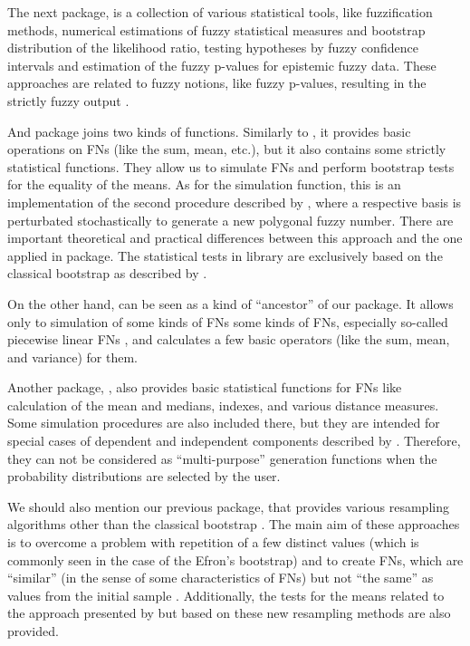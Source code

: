 The next package,  \citep{FuzzySTsMan} is a collection of various statistical tools, like fuzzification methods, numerical estimations of fuzzy statistical measures and bootstrap distribution of the likelihood ratio, testing hypotheses by fuzzy confidence intervals and estimation of the fuzzy p-values for epistemic fuzzy data.
These approaches are related to fuzzy notions, like fuzzy p-values, resulting in the strictly fuzzy output \citep{Berkachy2019}.

And  \citep{Trutschnig2013} package joins two kinds of functions.
Similarly to , it provides basic operations on FNs (like the sum, mean, etc.), but it also contains some strictly statistical functions.
They allow us to simulate FNs and perform bootstrap tests for the equality of the means.
As for the simulation function, this is an implementation of the second procedure described by \cite{GONZALEZRODRIGUEZ2009642}, where a respective basis is perturbated stochastically to generate
a new polygonal fuzzy number.
There are important theoretical and practical differences \citep{FRV} between this approach and the one applied in  package.
The statistical tests in  library are exclusively based on the classical bootstrap as described by \cite{COLUBI2009344,Montenegro2004}.

On the other hand,  \citep{SimPLFNMan} can be seen as a kind of ``ancestor'' of our package.
It allows only to simulation of some kinds of FNs some kinds of FNs, especially so-called piecewise linear FNs \citep{COROIANU201326}, and calculates a few basic operators (like the sum, mean, and variance) for them.

Another package,  \citep{FuzzyStatTraMan}, also provides basic statistical functions for FNs like calculation of the mean and medians, indexes, and various distance measures.
Some simulation procedures are also included there, but they are intended for special cases of dependent and independent components described by \cite{7295579}.
Therefore, they can not be considered as ``multi-purpose'' generation functions when the probability distributions are selected by the user.

We should also mention our previous package,  \citep{FuzzyResampling} that provides various resampling algorithms other than the classical bootstrap \citep{fuzzyResamplingArt}.
The main aim of these approaches is to overcome a problem with repetition of a few distinct values (which is commonly seen in the case of the Efron's bootstrap) and to create FNs, which are ``similar'' (in the sense of some characteristics of FNs) but not ``the same'' as values from the initial sample \citep{grzegorzewski_amcs2020,romaniuk_hryniewicz,GrzegorzewskiRom2021}.
Additionally, the tests for the means related to the approach presented by \cite{LUBIANO2016918} but based on these new resampling methods are also provided.

